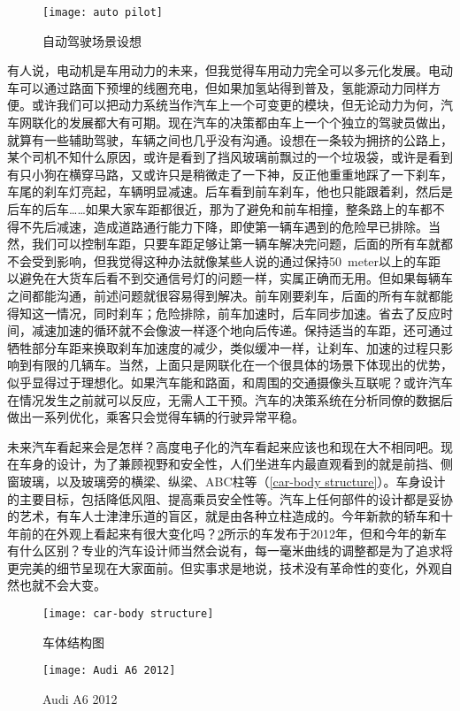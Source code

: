 \documentclass[UTF8]{ctexart}
\numberwithin{figure}{section}
\numberwithin{table}{section}
\begin{document}
\begin{figure}[htbp]
	\centering
	\begin{minipage}[b]{0.6\textwidth}
		\centering
		\texttt{[image: auto pilot]}
		\caption{自动驾驶场景设想}
		\label{auto pilot}
	\end{minipage}
\end{figure}

有人说，电动机是车用动力的未来，但我觉得车用动力完全可以多元化发展。电动车可以通过路面下预埋的线圈充电，但如果加氢站得到普及，氢能源动力同样方便。或许我们可以把动力系统当作汽车上一个可变更的模块，但无论动力为何，汽车网联化的发展都大有可期。现在汽车的决策都由车上一个个独立的驾驶员做出，就算有一些辅助驾驶，车辆之间也几乎没有沟通。设想在一条较为拥挤的公路上，某个司机不知什么原因，或许是看到了挡风玻璃前飘过的一个垃圾袋，或许是看到有只小狗在横穿马路，又或许只是稍微走了一下神，反正他重重地踩了一下刹车，车尾的刹车灯亮起，车辆明显减速。后车看到前车刹车，他也只能跟着刹，然后是后车的后车……如果大家车距都很近，那为了避免和前车相撞，整条路上的车都不得不先后减速，造成道路通行能力下降，即使第一辆车遇到的危险早已排除。当然，我们可以控制车距，只要车距足够让第一辆车解决完问题，后面的所有车就都不会受到影响，但我觉得这种办法就像某些人说的通过保持\SI{50}{meter}以上的车距以避免在大货车后看不到交通信号灯的问题一样，实属正确而无用。但如果每辆车之间都能沟通，前述问题就很容易得到解决。前车刚要刹车，后面的所有车就都能得知这一情况，同时刹车；危险排除，前车加速时，后车同步加速。省去了反应时间，减速加速的循环就不会像波一样逐个地向后传递。保持适当的车距，还可通过牺牲部分车距来换取刹车加速度的减少，类似缓冲一样，让刹车、加速的过程只影响到有限的几辆车。当然，上面只是网联化在一个很具体的场景下体现出的优势，似乎显得过于理想化。如果汽车能和路面，和周围的交通摄像头互联呢？或许汽车在情况发生之前就可以反应，无需人工干预。汽车的决策系统在分析同僚的数据后做出一系列优化，乘客只会觉得车辆的行驶异常平稳。

未来汽车看起来会是怎样？高度电子化的汽车看起来应该也和现在大不相同吧。现在车身的设计，为了兼顾视野和安全性，人们坐进车内最直观看到的就是前挡、侧窗玻璃，以及玻璃旁的横梁、纵梁、ABC柱等（\cref{car-body structure}）。车身设计的主要目标，包括降低风阻、提高乘员安全性等。汽车上任何部件的设计都是妥协的艺术，有车人士津津乐道的盲区，就是由各种立柱造成的。今年新款的轿车和十年前的在外观上看起来有很大变化吗？\cref{Audi A6 2012}所示的车发布于2012年，但和今年的新车有什么区别？专业的汽车设计师当然会说有，每一毫米曲线的调整都是为了追求将更完美的细节呈现在大家面前。但实事求是地说，技术没有革命性的变化，外观自然也就不会大变。

\begin{figure}[htbp]
	\centering
	\begin{minipage}[b]{0.45\textwidth}
		\centering
		\texttt{[image: car-body structure]}
		\caption{车体结构图}
		\label{car-body structure}
	\end{minipage}
	\begin{minipage}[b]{0.5\textwidth}
		\centering
		\texttt{[image: Audi A6 2012]}
		\caption{Audi A6 2012}
		\label{Audi A6 2012}
	\end{minipage}
\end{figure}
\end{document}
